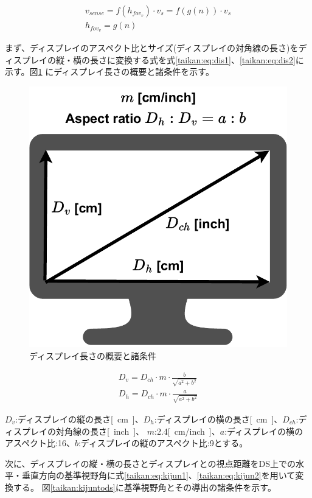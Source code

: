 \begin{align}
  v_{sense} = f(h_{fov_v})\cdot v_s = f(g(n))\cdot v_s \label{taikan:eq:model1}\\
  h_{fov_v} = g(n) \label{taikan:eq:model2}
\end{align}

まず、ディスプレイのアスペクト比とサイズ(ディスプレイの対角線の長さ)をディスプレイの縦・横の長さに変換する式を式\eqref{taikan:eq:dis1}、\eqref{taikan:eq:dis2}に示す。図\ref{taikan:displaytosize}
にディスプレイ長さの概要と諸条件を示す。

\begin{figure}[h]
  \begin{center}
  \includegraphics[width=.65\linewidth]{img/12.pdf}
  \caption{ディスプレイ長さの概要と諸条件}
  \label{taikan:displaytosize}
  \end{center}
\end{figure}

\begin{align}
    D_v = D_{ch} \cdot m \cdot \frac{b}{\sqrt{a^2+b^2}} \label{taikan:eq:dis1}\\
    D_h = D_{ch} \cdot m \cdot \frac{a}{\sqrt{a^2+b^2}} \label{taikan:eq:dis2}
\end{align}

$D_v$:ディスプレイの縦の長さ\si{[cm]}、$D_h$:ディスプレイの横の長さ\si{[cm]}、$D_{ch}$:ディスプレイの対角線の長さ\si{[inch]}、
$m$:2.4\si{[cm/inch]}、$a$:ディスプレイの横のアスペクト比:16、$b$:ディスプレイの縦のアスペクト比:9とする。

次に、ディスプレイの縦・横の長さとディスプレイとの視点距離をDS上での水平・垂直方向の基準視野角に式\eqref{taikan:eq:kijun1}、\eqref{taikan:eq:kijun2}を用いて変換する。
図\ref{taikan:kijuntods}に基準視野角とその導出の諸条件を示す。


